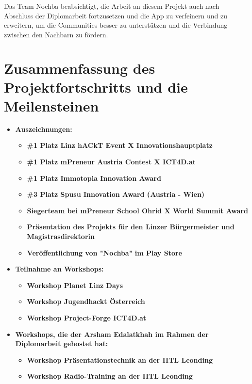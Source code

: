 Das Team Nochba beabsichtigt, die Arbeit an diesem Projekt auch nach Abschluss der Diplomarbeit fortzusetzen und die App zu verfeinern und zu erweitern, um die Communities besser zu unterstützen und die Verbindung zwischen den Nachbarn zu fördern.

\section{Zusammenfassung des Projektfortschritts und die Meilensteinen}

\begin{itemize}
    \item \textbf{Auszeichnungen:}
          \begin{itemize}
              \item \textbf{\#1 Platz Linz hACkT Event X Innovationshauptplatz}
              \item \textbf{\#1 Platz mPreneur Austria Contest X ICT4D.at}
              \item \textbf{\#1 Platz Immotopia Innovation Award}
              \item \textbf{\#3 Platz Spusu Innovation Award (Austria - Wien)}
              \item \textbf{Siegerteam bei mPreneur School Ohrid X World Summit Award}
              \item \textbf{Präsentation des Projekts für den Linzer Bürgermeister und Magistrasdirektorin}
              \item \textbf{Veröffentlichung von "Nochba" im Play Store}
          \end{itemize}
    \item \textbf{Teilnahme an Workshops:}
          \begin{itemize}
              \item \textbf{Workshop Planet Linz Days}
              \item \textbf{Workshop Jugendhackt Österreich}
              \item \textbf{Workshop Project-Forge ICT4D.at}
          \end{itemize}
    \item \textbf{Workshops, die der Arsham Edalatkhah im Rahmen der Diplomarbeit gehostet hat:}
          \begin{itemize}
              \item \textbf{Workshop Präsentationstechnik an der HTL Leonding}
              \item \textbf{Workshop Radio-Training an der HTL Leonding}

\end{itemize}
\end{itemize}
